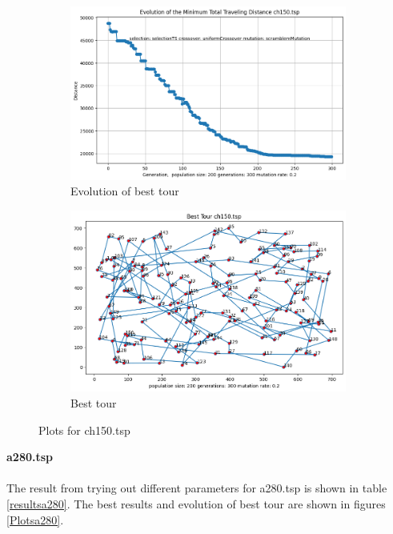 \documentclass[12pt]{report}
\begin{document}
    \begin{figure}[H]
		\centering
		\begin{subfigure}{.5\textwidth}
			\centering
			\includegraphics[width=.99\linewidth]{../Results/ch150/Evolution.png}
			\caption{Evolution of best tour}
			\label{Evolutionch150}
		\end{subfigure}%
		\begin{subfigure}{.5\textwidth}
			\centering
			\includegraphics[width=.8\linewidth]{../Results/ch150/bestTour.png}
			\caption{Best tour}
			\label{bestTourch150}
		\end{subfigure}
		\caption{Plots for ch150.tsp}
		\label{Plotsch150}
	\end{figure}
    \newpage
    \noindent \textbf{a280.tsp}\\
    \\
    The result from trying out different parameters for a280.tsp is shown in table \ref{resultsa280}. The best results and evolution of best tour are shown in figures \ref{Plotsa280}.
\end{document}
